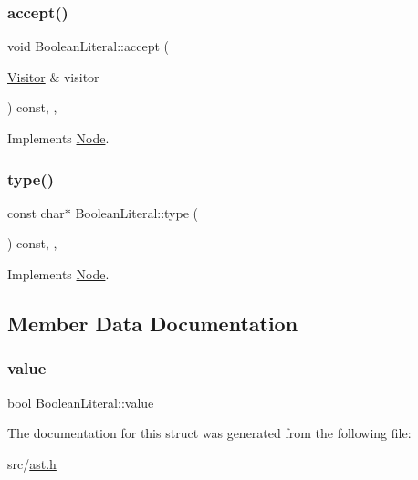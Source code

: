 \subsubsection{\texorpdfstring{accept()}{accept()}}
{\footnotesize\ttfamily void Boolean\+Literal\+::accept (\begin{DoxyParamCaption}\item[{\hyperlink{struct_visitor}{Visitor} \&}]{visitor }\end{DoxyParamCaption}) const\hspace{0.3cm}{\ttfamily [inline]}, {\ttfamily [override]}, {\ttfamily [virtual]}}



Implements \hyperlink{struct_node_a10bd7af968140bbf5fa461298a969c71}{Node}.

\mbox{\label{struct_boolean_literal_aa10a3ecbeefe15607c3ac43ed63ba8da}} 
\subsubsection{\texorpdfstring{type()}{type()}}
{\footnotesize\ttfamily const char$\ast$ Boolean\+Literal\+::type (\begin{DoxyParamCaption}{ }\end{DoxyParamCaption}) const\hspace{0.3cm}{\ttfamily [inline]}, {\ttfamily [override]}, {\ttfamily [virtual]}}



Implements \hyperlink{struct_node_a82f29420d0a38efcc370352528e94e9b}{Node}.



\subsection{Member Data Documentation}
\mbox{\label{struct_boolean_literal_a2d343f4fae4b805fc0260cc86c38d3cc}} 
\subsubsection{\texorpdfstring{value}{value}}
{\footnotesize\ttfamily bool Boolean\+Literal\+::value}



The documentation for this struct was generated from the following file\+:\begin{DoxyCompactItemize}
\item 
src/\hyperlink{ast_8h}{ast.\+h}\end{DoxyCompactItemize}
